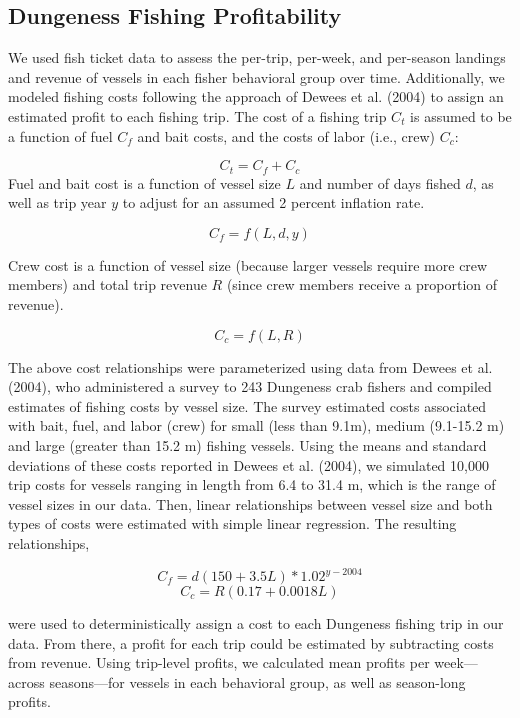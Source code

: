 \documentclass[]{elsarticle} %
\begin{document}
\hypertarget{dungeness-fishing-profitability}{%
\subsection{Dungeness Fishing
Profitability}\label{dungeness-fishing-profitability}}

We used fish ticket data to assess the per-trip, per-week, and
per-season landings and revenue of vessels in each fisher behavioral
group over time. Additionally, we modeled fishing costs following the
approach of Dewees et al. (2004) to assign an estimated profit to each
fishing trip. The cost of a fishing trip \(C_t\) is assumed to be a
function of fuel \(C_f\) and bait costs, and the costs of labor (i.e.,
crew) \(C_c\):

\[C_t = C_f + C_c\] Fuel and bait cost is a function of vessel size
\(L\) and number of days fished \(d\), as well as trip year \(y\) to
adjust for an assumed 2 percent inflation rate.

\[C_f = f(L,d,y)\]

Crew cost is a function of vessel size (because larger vessels require
more crew members) and total trip revenue \(R\) (since crew members
receive a proportion of revenue).

\[C_c = f(L,R)\]

The above cost relationships were parameterized using data from Dewees
et al. (2004), who administered a survey to 243 Dungeness crab fishers
and compiled estimates of fishing costs by vessel size. The survey
estimated costs associated with bait, fuel, and labor (crew) for small
(less than 9.1m), medium (9.1-15.2 m) and large (greater than 15.2 m)
fishing vessels. Using the means and standard deviations of these costs
reported in Dewees et al. (2004), we simulated 10,000 trip costs for
vessels ranging in length from 6.4 to 31.4 m, which is the range of
vessel sizes in our data. Then, linear relationships between vessel size
and both types of costs were estimated with simple linear regression.
The resulting relationships,

\[C_f = d(150+3.5L)*1.02^{y-2004}\] \[C_c = R(0.17 + 0.0018L)\]

were used to deterministically assign a cost to each Dungeness fishing
trip in our data. From there, a profit for each trip could be estimated
by subtracting costs from revenue. Using trip-level profits, we
calculated mean profits per week---across seasons---for vessels in each
behavioral group, as well as season-long profits.
\end{document}
